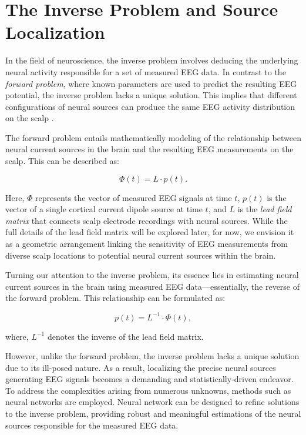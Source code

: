 \documentclass[a4paper, UKenglish, 11pt]{uiomaster}
\begin{document}
\section{The Inverse Problem and Source Localization}
In the field of neuroscience, the inverse problem involves deducing the underlying neural activity responsible for a set of measured EEG data. In contrast to the \emph{forward problem}, where known parameters are used to predict the resulting EEG potential, the inverse problem lacks a unique solution. This implies that different configurations of neural sources can produce the same EEG activity distribution on the scalp \cite{hecker2021convdip}.

The forward problem entails mathematically modeling of the relationship between neural current sources in the brain and the resulting EEG measurements on the scalp. This can be described as:

\begin{equation}
\Phi(t) = L \cdot p(t).
\label{eq:forward_problem}
\end{equation}

Here, $\Phi$ represents the vector of measured EEG signals at time $t$, $p(t)$ is the vector of a single cortical current dipole source at time $t$, and $L$ is the \emph{lead field matrix} that connects scalp electrode recordings with neural sources. While the full details of the lead field matrix will be explored later, for now, we envision it as a geometric arrangement linking the sensitivity of EEG measurements from diverse scalp locations to potential neural current sources within the brain.

Turning our attention to the inverse problem, its essence lies in estimating neural current sources in the brain using measured EEG data—essentially, the reverse of the forward problem. This relationship can be formulated as:

\begin{equation}
p(t) = L^{-1} \cdot \Phi(t),
\label{eq:inverse_problem}
\end{equation}

where, $L^{-1}$ denotes the inverse of the lead field matrix.

However, unlike the forward problem, the inverse problem lacks a unique solution due to its ill-posed nature. As a result, localizing the precise neural sources generating EEG signals becomes a demanding and statistically-driven endeavor. To address the complexities arising from numerous unknowns, methods such as neural networks are employed. Neural network can be designed to refine solutions to the inverse problem, providing robust and meaningful estimations of the neural sources responsible for the measured EEG data.
\end{document}
